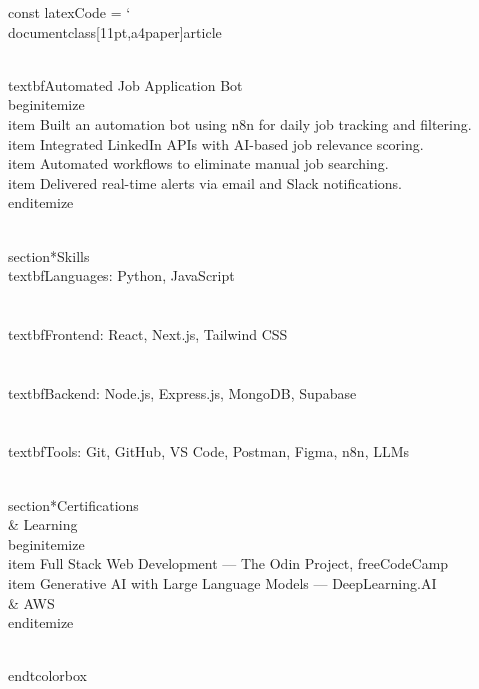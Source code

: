 const latexCode = `\\documentclass[11pt,a4paper]{article}
\begin{document}
\\textbf{Automated Job Application Bot}
\\begin{itemize}
  \\item Built an automation bot using n8n for daily job tracking and filtering.
  \\item Integrated LinkedIn APIs with AI-based job relevance scoring.
  \\item Automated workflows to eliminate manual job searching.
  \\item Delivered real-time alerts via email and Slack notifications.
\\end{itemize}

\\section*{Skills}
\\textbf{Languages:} Python, JavaScript \\\\
\\textbf{Frontend:} React, Next.js, Tailwind CSS \\\\
\\textbf{Backend:} Node.js, Express.js, MongoDB, Supabase \\\\
\\textbf{Tools:} Git, GitHub, VS Code, Postman, Figma, n8n, LLMs

\\section*{Certifications \\& Learning}
\\begin{itemize}
  \\item Full Stack Web Development — The Odin Project, freeCodeCamp
   \\item Generative AI with Large Language Models — DeepLearning.AI \\& AWS
\\end{itemize}

\\end{tcolorbox}

\
\end{document}
